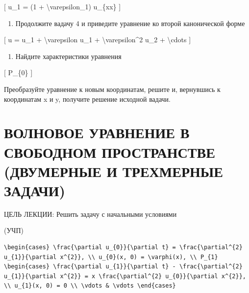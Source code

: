 \documentclass[
]{article}
\providecommand{\tightlist}{%
  \setlength{\itemsep}{0pt}\setlength{\parskip}{0pt}}
\begin{document}
{[} u\_1 = (1 + \textbackslash varepsilon\_1) u\_\{xx\} {]}

\begin{enumerate}
\def\labelenumi{\arabic{enumi}.}
\setcounter{enumi}{4}
\tightlist
\item
  Продолжите вадачу 4 и приведите уравнение ко второй канонической форме
\end{enumerate}

{[} u = u\_1 + \textbackslash varepsilon u\_1 +
\textbackslash varepsilon\^{}2 u\_2 + \textbackslash cdots {]}

\begin{enumerate}
\def\labelenumi{\arabic{enumi}.}
\setcounter{enumi}{5}
\tightlist
\item
  Найдите характеристики уравнения
\end{enumerate}

{[} P\_\{0\} {]}

Преобразуйте уравнение к новым координатам, решите и, вернувшись к
координатам x и y, получите решение исходной вадачи.

\section{ВОЛНОВОЕ УРАВНЕНИЕ В СВОБОДНОМ ПРОСТРАНСТВЕ (ДВУМЕРНЫЕ И
ТРЕХМЕРНЫЕ
ЗАДАЧИ)}\label{ux432ux43eux43bux43dux43eux432ux43eux435-ux443ux440ux430ux432ux43dux435ux43dux438ux435-ux432-ux441ux432ux43eux431ux43eux434ux43dux43eux43c-ux43fux440ux43eux441ux442ux440ux430ux43dux441ux442ux432ux435-ux434ux432ux443ux43cux435ux440ux43dux44bux435-ux438-ux442ux440ux435ux445ux43cux435ux440ux43dux44bux435-ux437ux430ux434ux430ux447ux438}

ЦЕЛЬ ЛЕКЦИИ: Решить задачу с начальными условиями

(УЧП)

\begin{verbatim}
\begin{cases} \frac{\partial u_{0}}{\partial t} = \frac{\partial^{2} u_{1}}{\partial x^{2}}, \\ u_{0}(x, 0) = \varphi(x), \\ P_{1} \begin{cases} \frac{\partial u_{1}}{\partial t} - \frac{\partial^{2} u_{1}}{\partial x^{2}} = x \frac{\partial^{2} u_{0}}{\partial x^{2}}, \\ u_{1}(x, 0) = 0 \\ \vdots & \vdots \end{cases}
\end{verbatim}
\end{document}
